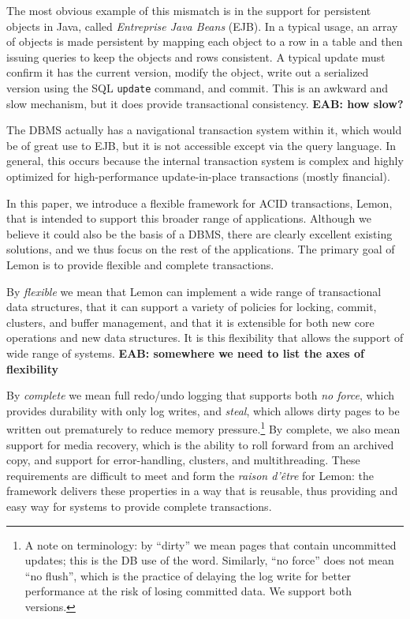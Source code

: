 \documentclass[letterpaper,twocolumn,english]{article}
\newcommand{\yad}{Lemon\xspace}
\newcommand{\eab}[1]{{\bf EAB: #1}}
\begin{document}
The most obvious example of this mismatch is in the support for
persistent objects in Java, called {\em Entreprise Java Beans}
(EJB). In a typical usage, an array of objects is made persistent by
mapping each object to a row in a table and then issuing queries to
keep the objects and rows consistent.  A typical update must confirm
it has the current version, modify the object, write out a serialized
version using the SQL {\tt update} command, and commit.  This is an
awkward and slow mechanism, but it does provide transactional
consistency. \eab{how slow?}

The DBMS actually has a navigational transaction system within it,
which would be of great use to EJB, but it is not accessible except
via the query language.  In general, this occurs because the internal
transaction system is complex and highly optimized for
high-performance update-in-place transactions (mostly financial).

In this paper, we introduce a flexible framework for ACID
transactions, \yad, that is intended to support this broader range of
applications.  Although we believe it could also be the basis of a
DBMS, there are clearly excellent existing solutions, and we thus
focus on the rest of the applications.  The primary goal of \yad is to
provide flexible and complete transactions.

By {\em flexible} we mean that \yad can implement a wide range of
transactional data structures, that it can support a variety of
policies for locking, commit, clusters, and buffer management, and
that it is extensible for both new core operations and new data
structures.  It is this flexibility that allows the support of wide
range of systems. \eab{somewhere we need to list the axes of flexibility}

By {\em complete} we mean full redo/undo logging that supports both
{\em no force}, which provides durability with only log writes, and
{\em steal}, which allows dirty pages to be written out prematurely to
reduce memory pressure.\footnote{A note on terminology: by ``dirty''
we mean pages that contain uncommitted updates; this is the DB use of
the word. Similarly, ``no force'' does not mean ``no flush'', which is
the practice of delaying the log write for better performance at the
risk of losing committed data. We support both versions.} By complete,
we also mean support for media recovery, which is the ability to roll
forward from an archived copy, and support for error-handling,
clusters, and multithreading.  These requirements are difficult to
meet and form the {\em raison d'\^{e}tre} for \yad: the framework delivers
these properties in a way that is reusable, thus providing and easy
way for systems to provide complete transactions.
\end{document}
